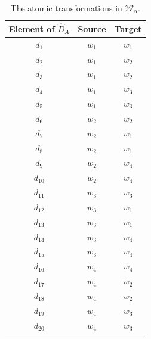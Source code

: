 \begin{table}[H]
    \centering
    \begin{tabular}{c|c c}
        \hline
        Element of $\hat{D}_{A}$ & Source  & Target  \\
        \hline
        $d_{1}$ & $w_{1}$ & $w_{1}$ \\
        $d_{2}$ & $w_{1}$ & $w_{2}$ \\
        $d_{3}$ & $w_{1}$ & $w_{2}$ \\
        $d_{4}$ & $w_{1}$ & $w_{3}$ \\
        $d_{5}$ & $w_{1}$ & $w_{3}$ \\
        $d_{6}$ & $w_{2}$ & $w_{2}$ \\
        $d_{7}$ & $w_{2}$ & $w_{1}$ \\
        $d_{8}$ & $w_{2}$ & $w_{1}$ \\
        $d_{9}$ & $w_{2}$ & $w_{4}$ \\
        $d_{10}$ & $w_{2}$ & $w_{4}$ \\
        $d_{11}$ & $w_{3}$ & $w_{3}$ \\
        $d_{12}$ & $w_{3}$ & $w_{1}$ \\
        $d_{13}$ & $w_{3}$ & $w_{1}$ \\
        $d_{14}$ & $w_{3}$ & $w_{4}$ \\
        $d_{15}$ & $w_{3}$ & $w_{4}$ \\
        $d_{16}$ & $w_{4}$ & $w_{4}$ \\
        $d_{17}$ & $w_{4}$ & $w_{2}$ \\
        $d_{18}$ & $w_{4}$ & $w_{2}$ \\
        $d_{19}$ & $w_{4}$ & $w_{3}$ \\
        $d_{20}$ & $w_{4}$ & $w_{3}$ \\
    \end{tabular}
    \caption{
    The atomic transformations in $\mathscr{W}_{\alpha}$.
    }
    \label{tab:2x2_gridworld_length_1_transformations}
\end{table}

